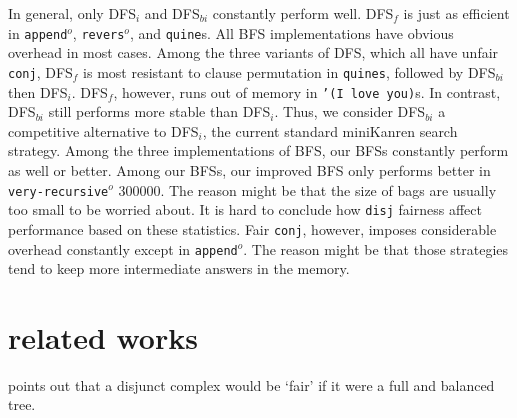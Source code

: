 \documentclass[format=acmlarge, review=true, authordraft=true]{acmart}
\newcommand{\conj}{\texttt{conj}}
\newcommand{\disj}{\texttt{disj}}
\newcommand{\veryrecursiveo}{\texttt{very-recursive$^o$}}
\newcommand{\appendo}{\texttt{append$^o$}}
\newcommand{\reverso}{\texttt{revers$^o$}}
\newcommand{\DFSi }[0]{DFS$_{i}$}
\newcommand{\DFSf }[0]{DFS$_{f}$}
\newcommand{\DFSbi}[0]{DFS$_{bi}$}
\newcommand{\BFS}[0]{BFS}
\newcommand{\BFSimp}[0]{our improved BFS}
\begin{document}



In general, only \DFSi{} and \DFSbi{} constantly perform well. \DFSf{}
is just as efficient in \appendo, \reverso, and \texttt{quine}s. All BFS
implementations have obvious overhead in most cases. 
Among the three variants of DFS, which all have unfair \conj{}, \DFSf{} is most 
resistant to clause permutation in \texttt{quines}, followed by \DFSbi{} then 
\DFSi{}. \DFSf{}, however, runs out of memory in \texttt{'(I love you)}s. In 
contrast, \DFSbi{} still performs more stable than \DFSi{}. Thus, we consider 
\DFSbi{} a competitive alternative to \DFSi{}, the current standard miniKanren 
search strategy. 
Among the three implementations of \BFS, our \BFS{}s constantly perform as well 
or better. Among our \BFS{}s, \BFSimp{} only performs better in 
\veryrecursiveo{} 300000. The reason might be that the size of bags are usually 
too small to be worried about. 
It is hard to conclude how \disj{} fairness affect performance based on these 
statistics. 
Fair \conj{}, however, imposes considerable overhead constantly except in 
\appendo. The reason might be that those strategies tend to keep more 
intermediate answers in the memory.

\section{related works}

\citet{yang2010adventures} points out that a disjunct complex would be `fair' 
if it were a full and balanced tree.
\end{document}
